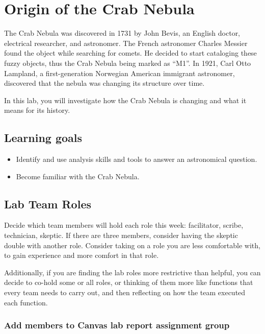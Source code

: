 \chapter{Origin of the Crab Nebula}

The Crab Nebula was discovered in 1731 by John Bevis, an English doctor, electrical researcher, and astronomer. The French astronomer Charles Messier found the object while searching for comets. He decided to start cataloging these fuzzy objects, thus the Crab Nebula being marked as ``M1''. In 1921, Carl Otto Lampland, a first-generation Norwegian American immigrant astronomer, discovered that the nebula was changing its structure over time.

In this lab, you will investigate how the Crab Nebula is changing and what it means for its history.

\section{Learning goals}

\begin{itemize}
	\item Identify and use analysis skills and tools to answer an astronomical question.
	
	\item Become familiar with the Crab Nebula.
\end{itemize}

\section{Lab Team Roles}

Decide which team members will hold each role this week: facilitator, scribe, technician, skeptic. If there are three members, consider having the skeptic double with another role. Consider taking on a role you are less comfortable with, to gain experience and more comfort in that role.

Additionally, if you are finding the lab roles more restrictive than helpful, you can decide to co-hold some or all roles, or thinking of them more like functions that every team needs to carry out, and then reflecting on how the team executed each function.

\subsection{Add members to Canvas lab report assignment group}


